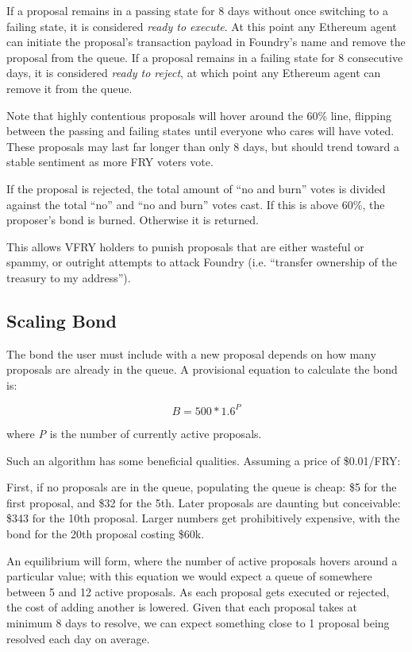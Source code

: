 If a proposal remains in a passing state for 8 days without once switching to a failing state, it is considered \textit{ready to execute}. At this point any Ethereum agent can initiate the proposal's transaction payload in Foundry's name and remove the proposal from the queue. If a proposal remains in a failing state for 8 consecutive days, it is considered \textit{ready to reject}, at which point any Ethereum agent can remove it from the queue.

Note that highly contentious proposals will hover around the 60\% line, flipping between the passing and failing states until everyone who cares will have voted. These proposals may last far longer than only 8 days, but should trend toward a stable sentiment as more FRY voters vote.

If the proposal is rejected, the total amount of ``no and burn'' votes is divided against the total ``no'' and ``no and burn'' votes cast. If this is above 60\%, the proposer's bond is burned. Otherwise it is returned.

This allows VFRY holders to punish proposals that are either wasteful or spammy, or outright attempts to attack Foundry (i.e. ``transfer ownership of the treasury to my address'').

\subsection{Scaling Bond} \label{bond}

The bond the user must include with a new proposal depends on how many proposals are already in the queue. A provisional equation to calculate the bond is:

\[B = 500 * 1.6^P\]

where \textit{P} is the number of currently active proposals.

Such an algorithm has some beneficial qualities. Assuming a price of \$0.01/FRY:

First, if no proposals are in the queue, populating the queue is cheap: \$5 for the first proposal, and \$32 for the 5th. Later proposals are daunting but conceivable: \$343 for the 10th proposal. Larger numbers get prohibitively expensive, with the bond for the 20th proposal costing \$60k.

An equilibrium will form, where the number of active proposals hovers around a particular value; with this equation we would expect a queue of somewhere between 5 and 12 active proposals. As each proposal gets executed or rejected, the cost of adding another is lowered. Given that each proposal takes at minimum 8 days to resolve, we can expect something close to 1 proposal being resolved each day on average.

